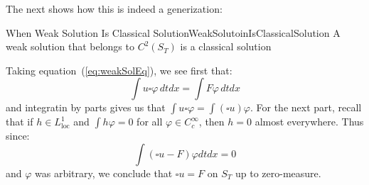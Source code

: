 \documentclass{book}
\newenvironment{Proof}[1][]
  {\begin{ProofTcb}[#1]}
  {\end{ProofTcb}}
\renewcommand{\phi}{\varphi}
\begin{document}
The next shows how this is indeed a generization:

\begin{prop}{When Weak Solution Is Classical Solution}{WeakSolutoinIsClassicalSolution}
	A weak solution that belongs to $C^2(S_T)$ is a classical solution
\end{prop}

\begin{Proof}
	Taking equation~(\ref{eq:weakSolEq}),  we see first that:
	\[
		\int u\square \phi\, dtdx = \int F\phi\, dtdx
	\]
	and integratin by parts gives us that $\int u\square \phi = \int(\square u)\phi$. For the next part, recall that if
	$h \in L_{\text{loc}}^1$ and $\int h\phi = 0$ for all $\phi \in C_c^\infty$, then $h = 0$ almost everywhere. Thus
	since:
	\[
		\int (\square u - F)\phi dtdx = 0
	\]
	and $\phi$ was arbitrary, we conclude that $\square u = F$ on $S_T$ up to zero-measure.


\end{Proof}
\end{document}
